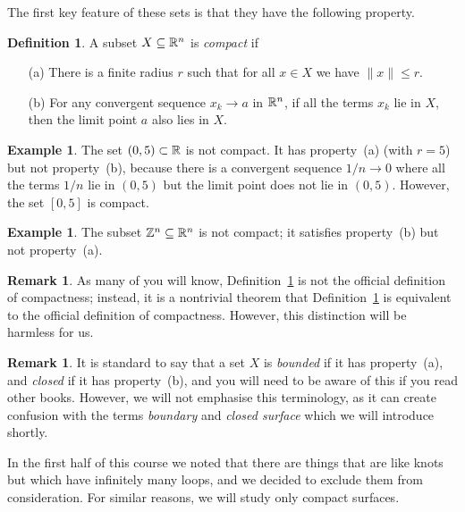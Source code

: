 \documentclass[reqno]{amsart}
\theoremstyle{definition}
\newtheorem{remark}[theorem]{Remark}
\newtheorem{definition}[theorem]{Definition}
\newtheorem{example}[theorem]{Example}
\begin{document}
The first key feature of these sets is that they have the following
property.
\begin{definition}\label{defn-compact}
 A subset $X\subseteq\mathbb{R}^n$ is \emph{compact} if 
 \begin{itemize}
  \item[(a)] There is a finite radius $r$ such that for all $x\in X$
   we have $\|x\|\leq r$.
  \item[(b)] For any convergent sequence $x_k\to a$ in $\mathbb{R}^n$, if all
   the terms $x_k$ lie in $X$, then the limit point $a$ also lies in
   $X$.  
 \end{itemize}
\end{definition}

\begin{example}
 The set $(0,5)\subset\mathbb{R}$ is not compact.  It has property~(a) (with
 $r=5$) but not property~(b), because there is a convergent sequence
 $1/n\to 0$ where all the terms $1/n$ lie in $(0,5)$ but the limit
 point does not lie in $(0,5)$.  However, the set $[0,5]$ is compact.
\end{example}

\begin{example}
 The subset $\mathbb{Z}^n\subseteq\mathbb{R}^n$ is not compact; it satisfies property~(b)
 but not property~(a).
\end{example}

\begin{remark}
 As many of you will know, Definition~\ref{defn-compact} is not the
 official definition of compactness; instead, it is a nontrivial theorem
 that Definition~\ref{defn-compact} is equivalent to the official
 definition of compactness.  However, this distinction will be
 harmless for us.
\end{remark}

\begin{remark}
 It is standard to say that a set $X$ is \emph{bounded} if it has
 property~(a), and \emph{closed} if it has property~(b), and you will
 need to be aware of this if you read other books.  However, we will
 not emphasise this terminology, as it can create confusion with the
 terms \emph{boundary} and \emph{closed surface} which we will
 introduce shortly.
\end{remark}

In the first half of this course we noted that there are things that
are like knots but which have infinitely many loops, and we decided to
exclude them from consideration.  For similar reasons, we will study
only compact surfaces.  
\end{document}
